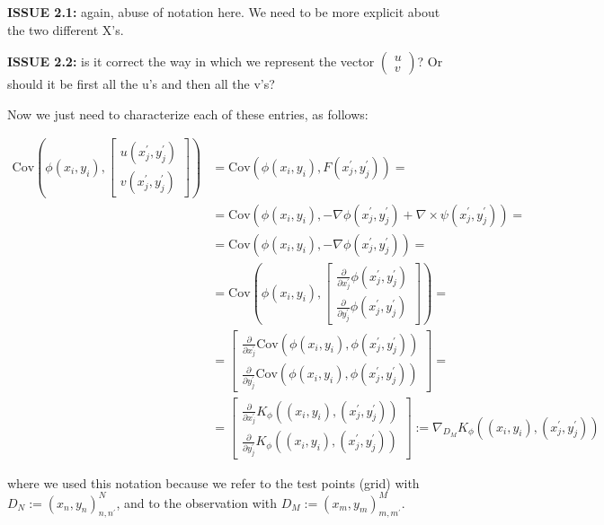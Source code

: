\documentclass[11pt,a4paper]{article}
\newcommand{\icol}[1]{%
  \left(\begin{smallmatrix}#1\end{smallmatrix}\right)%
}
\begin{document}
\textbf{ISSUE 2.1:} again, abuse of notation here. We need to be more explicit about the two different X's. \newline

\textbf{ISSUE 2.2:} is it correct the way in which we represent the vector $\icol{u \\ v }$? Or should it be first all the u's and then all the v's? \newline

Now we just need to characterize each of these entries, as follows:

\begin{align*}
    \text{Cov}\left(\phi(x_i, y_i), \begin{bmatrix}
    u(x_j^\prime, y_j^\prime) \\ v(x_j^\prime, y_j^\prime)
    \end{bmatrix}\right) &= \text{Cov}\left(\phi(x_i, y_i), F(x_j^\prime, y_j^\prime)\right) = \\
   &=   \text{Cov}\left(\phi(x_i, y_i), -\nabla \phi(x_j^\prime, y_j^\prime) +\nabla \times \psi(x_j^\prime, y_j^\prime)\right) = \\
   &= \text{Cov}\left(\phi(x_i, y_i), -\nabla \phi(x_j^\prime, y_j^\prime) \right) = \\
   &= \text{Cov}\left(\phi(x_i, y_i), \begin{bmatrix}
    \frac{\partial}{\partial x_j^\prime} \phi(x_j^\prime, y_j^\prime) \\ \frac{\partial}{\partial y_j^\prime} \phi(x_j^\prime, y_j^\prime) 
    \end{bmatrix}\right) = \\
    &= \begin{bmatrix}
    \frac{\partial}{\partial x_j^\prime} \text{Cov}(\phi(x_i, y_i), \phi(x_j^\prime, y_j^\prime)) \\
    \frac{\partial}{\partial y_j^\prime} \text{Cov}(\phi(x_i, y_i), \phi(x_j^\prime, y_j^\prime))
    \end{bmatrix} = \\
    &= \begin{bmatrix}
    \frac{\partial}{\partial x_j^\prime} K_{\phi}((x_i, y_i), (x_j^\prime, y_j^\prime)) \\
    \frac{\partial}{\partial y_j^\prime} K_{\phi}((x_i, y_i), (x_j^\prime, y_j^\prime))
    \end{bmatrix} := \nabla_{D_M} K_{\phi} ((x_i, y_i), (x_j^\prime, y_j^\prime))
\end{align*}

where we used this notation because we refer to the test points (grid) with $D_N := (x_n, y_n)_{n,n^\prime}^N$, and to the observation with $D_M := (x_m, y_m)_{m,m^\prime}^M$. \newline
\end{document}
